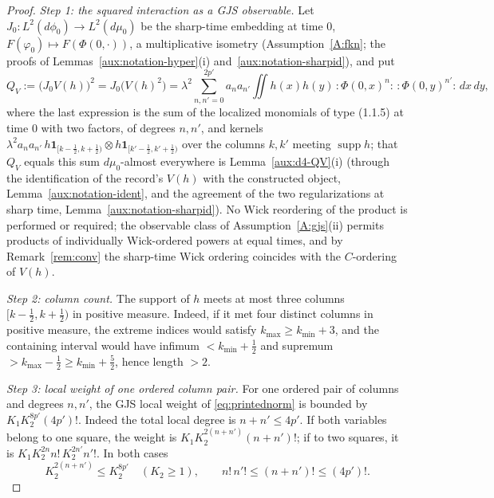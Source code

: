 \documentclass[11pt,a4paper]{article}
\theoremstyle{plain}
\theoremstyle{definition}
\theoremstyle{plain}
\theoremstyle{definition}
\DeclareMathOperator{\supp}{supp}
\begin{document}
\begin{proof}
\emph{Step 1: the squared interaction as a GJS observable.}
Let $J_0:L^2(d\phi_0)\to L^2(d\mu_0)$ be the sharp-time embedding at time $0$,
$F(\varphi_0)\mapsto F(\Phi(0,\cdot))$, a multiplicative isometry (Assumption~\ref{A:fkn};
the proofs of Lemmas~\ref{aux:notation-hyper}(i) and~\ref{aux:notation-sharpid}), and put
\begin{equation}
 Q_V:=\bigl(J_0V(h)\bigr)^2=J_0\bigl(V(h)^2\bigr)
 =\lambda^2\sum_{n,n'=0}^{2p'}a_na_{n'}
 \iint h(x)h(y)\,{:}\Phi(0,x)^n{:}\,{:}\Phi(0,y)^{n'}{:}\,dx\,dy ,
 \label{eq:QV}
\end{equation}
where the last expression is the sum of the localized monomials of type (1.1.5) at time $0$
with two factors, of degrees $n,n'$, and kernels $\lambda^2a_na_{n'}\,h\mathbf 1_{[k-\frac12,
k+\frac12)}\otimes h\mathbf 1_{[k'-\frac12,k'+\frac12)}$ over the columns $k,k'$ meeting
$\supp h$; that $Q_V$ equals this sum $d\mu_0$-almost everywhere is
Lemma~\ref{aux:d4-QV}(i) (through the identification of the record's $V(h)$ with the
constructed object, Lemma~\ref{aux:notation-ident}, and the agreement of the two
regularizations at sharp time, Lemma~\ref{aux:notation-sharpid}).  No Wick reordering of
the product is performed or required; the observable class of Assumption~\ref{A:gjs}(ii)
permits products of individually Wick-ordered powers at equal times, and by
Remark~\ref{rem:conv} the sharp-time Wick ordering coincides with the $C$-ordering of
$V(h)$.

\emph{Step 2: column count.}
The support of $h$ meets at most three columns $[k-\frac12,k+\frac12)$ in positive
measure. Indeed, if it met four distinct columns in positive measure, the extreme indices
would satisfy $k_{\max}\ge k_{\min}+3$, and the containing interval would have infimum
$<k_{\min}+\frac12$ and supremum $>k_{\max}-\frac12\ge k_{\min}+\frac52$, hence length $>2$.

\emph{Step 3: local weight of one ordered column pair.}
For one ordered pair of columns and degrees $n,n'$, the GJS local weight of
\eqref{eq:printednorm} is bounded by $K_1K_2^{8p'}(4p')!$. Indeed the total local degree is
$n+n'\le4p'$. If both variables belong to one square, the weight is
$K_1K_2^{2(n+n')}(n+n')!$; if to two squares, it is $K_1K_2^{2n}n!\,K_2^{2n'}n'!$. In both
cases
\[
 K_2^{2(n+n')}\le K_2^{8p'}\quad(K_2\ge1),\qquad
 n!\,n'!\le(n+n')!\le(4p')! .
\]


\end{proof}
\end{document}
